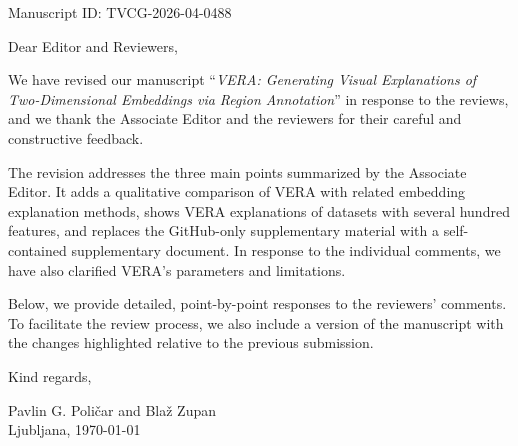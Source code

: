 \documentclass[11pt]{article}
\begin{document}
\onehalfspacing
\setlength{\parskip}{3mm}


\vspace{2mm}

\vspace{2mm}

\noindent Manuscript ID: TVCG-2026-04-0488

\vspace{2mm}

\noindent Dear Editor and Reviewers,\\

\vspace{3mm}

\noindent We have revised our manuscript ``\textit{VERA: Generating Visual Explanations of Two-Dimensional Embeddings via Region Annotation}'' in response to the reviews, and we thank the Associate Editor and the reviewers for their careful and constructive feedback.

\vspace{3mm}

\noindent The revision addresses the three main points summarized by the Associate Editor.
It adds a qualitative comparison of VERA with related embedding explanation methods, shows VERA explanations of datasets with several hundred features, and replaces the GitHub-only supplementary material with a self-contained supplementary document.
In response to the individual comments, we have also clarified VERA's parameters and limitations.

\vspace{3mm}

\noindent Below, we provide detailed, point-by-point responses to the reviewers' comments. To facilitate the review process, we also include a version of the manuscript with the changes highlighted relative to the previous submission.

\vspace{3mm}

\noindent Kind regards,
\vspace{3mm}

\noindent Pavlin G. Poli\v{c}ar and Bla\v{z} Zupan\\
\noindent Ljubljana, \today

\newpage
\end{document}
